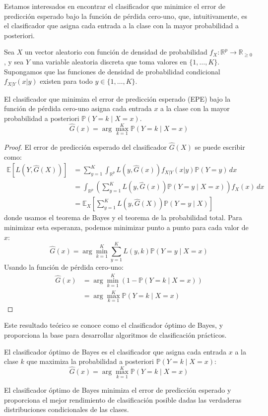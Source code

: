 Estamos interesados en encontrar el clasificador que minimice el error de predicción esperado bajo la función de pérdida cero-uno, que, intuitivamente, es el clasificador que asigna cada entrada a la clase con la mayor probabilidad a posteriori.

\begin{theorem}
Sea $X$ un vector aleatorio con función de densidad de probabilidad $f_X: \mathbb{R}^p \to \mathbb{R}_{\geq 0}$, y sea $Y$ una variable aleatoria discreta que toma valores en $\{1,\ldots,K\}$. Supongamos que las funciones de densidad de probabilidad condicional $f_{X|Y}(x|y)$ existen para todo $y \in \{1,\ldots,K\}$.

El clasificador que minimiza el error de predicción esperado (EPE) bajo la función de pérdida cero-uno asigna cada entrada $x$ a la clase con la mayor probabilidad a posteriori $\mathbb{P}(Y = k \mid X = x)$.
\[
\hat{G}(x) = \arg\max_{k=1}^K \mathbb{P}(Y = k \mid X = x)
\]
\end{theorem}

\begin{proof}
El error de predicción esperado del clasificador $\hat{G}(X)$ se puede escribir como:
\begin{align*}
\mathbb{E}[L(Y, \hat{G}(X))] & = \sum_{y=1}^K \int_{\mathbb{R}^{p}} L(y, \hat{G}(x)) f_{X|Y}(x|y)\mathbb{P}(Y=y)\, dx \\
& = \int_{\mathbb{R}^{p}} \left( \sum_{y=1}^K L(y, \hat{G}(x)) \mathbb{P}(Y = y \mid X = x) \right) f_X(x) \, dx \\
& = \mathbb{E}_X\left[ \sum_{y=1}^K L(y, \hat{G}(X)) \mathbb{P}(Y = y \mid X) \right]
\end{align*}
donde usamos el teorema de Bayes y el teorema de la probabilidad total. Para minimizar esta esperanza, podemos minimizar punto a punto para cada valor de $x$:
\[
\hat{G}(x) = \arg\min_{k=1}^K \sum_{y=1}^K L(y, k) \mathbb{P}(Y = y \mid X = x)
\]
Usando la función de pérdida cero-uno:
\begin{align*}
\hat{G}(x) & = \arg\min_{k=1}^K \left(1 - \mathbb{P}(Y = k \mid X = x)\right) \\
& = \arg\max_{k=1}^K \mathbb{P}(Y = k \mid X = x)
\end{align*}
\end{proof}

Este resultado teórico se conoce como el clasificador óptimo de Bayes, y proporciona la base para desarrollar algoritmos de clasificación prácticos.

\begin{definition}
El clasificador óptimo de Bayes es el clasificador que asigna cada entrada $x$ a la clase $k$ que maximiza la probabilidad a posteriori $\mathbb{P}(Y = k \mid X = x)$:
\[
\hat{G}(x) = \arg\max_{k=1}^K \mathbb{P}(Y = k \mid X = x)
\]
\end{definition}
El clasificador óptimo de Bayes minimiza el error de predicción esperado y proporciona el mejor rendimiento de clasificación posible dadas las verdaderas distribuciones condicionales de las clases.

